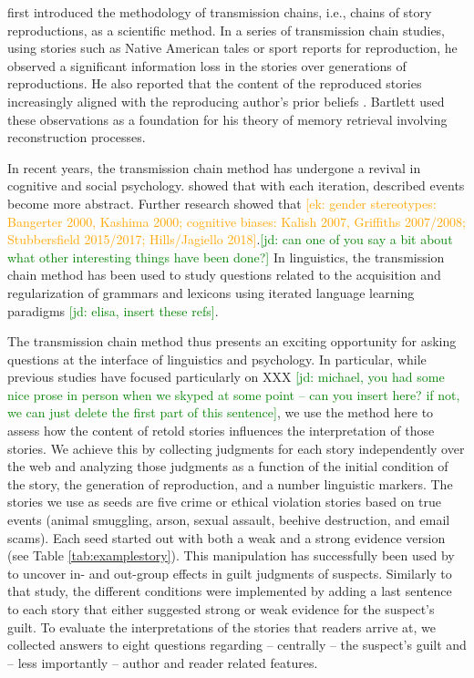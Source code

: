 \documentclass[10pt,letterpaper]{article}
\newcommand{\ek}[1]{\textcolor{Orange}{[ek: #1]}}
\newcommand{\jd}[1]{\textcolor{Green}{[jd: #1]}}
\begin{document}
 first introduced the methodology of transmission chains, i.e., chains of story reproductions, as a scientific method. In a series of transmission chain studies, using stories such as Native American tales or sport reports for reproduction, he observed a significant information loss in the stories over generations of reproductions. He also reported that the content of the reproduced stories increasingly aligned with the reproducing author's prior beliefs \cite<for a more recent demonstration, see>{Griffiths:2007}. Bartlett used these observations as a foundation for his theory of memory retrieval involving reconstruction processes.

In recent years, the transmission chain method has undergone a revival in cognitive and social psychology.   showed that with each iteration, described events become more abstract. Further research showed that  \ek{gender stereotypes: Bangerter 2000, Kashima 2000; cognitive biases: Kalish 2007, Griffiths 2007/2008; Stubbersfield 2015/2017; Hills/Jagiello 2018}.\jd{can one of you say a bit about what other interesting things have been done?} In linguistics, the transmission chain method has been used  to study questions related to the acquisition and regularization of grammars and lexicons using iterated language learning paradigms \cite{Winters, Kirby, an Smith, 2014, Kirby, Tamariz, Cornish, & Smith, 2015} \jd{elisa, insert these refs}.

The transmission chain method thus presents an exciting opportunity for asking questions at the interface  of linguistics and  psychology. In particular, while previous studies have focused particularly on XXX \jd{michael, you had some nice prose in person when we skyped at some point -- can you insert here? if not, we can just delete the first part of this sentence}, we use the method here to assess how the content of retold stories influences the interpretation of  those stories. We achieve this by collecting judgments for each story independently over the web and analyzing those judgments as a function of the initial condition of the story, the generation of reproduction, and a number linguistic markers. The stories we use as seeds are five crime or ethical violation stories based on true events (animal smuggling, arson, sexual assault, beehive destruction, and email scams). Each seed started out with both a weak and a strong evidence version (see Table \ref{tab:examplestory}). This manipulation has successfully been used by \cite{Van-Prooijen:2006} to uncover in- and out-group effects in guilt judgments of suspects. Similarly to that study, the different conditions were implemented by adding a last sentence to each story that either suggested strong or weak evidence for the suspect's guilt. To evaluate the interpretations of the stories that readers arrive at, we collected answers to eight questions regarding -- centrally -- the suspect's guilt and -- less importantly -- author and reader related features.
\end{document}
